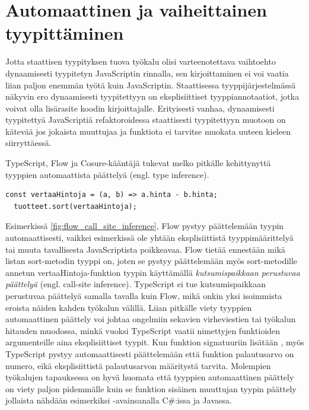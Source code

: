 \section{Automaattinen ja vaiheittainen tyypittäminen}

Jotta staattisen tyypityksen tuova työkalu olisi varteenotettava vaihtoehto
dynaamisesti tyypitetyn JavaScriptin rinnalla, sen kirjoittaminen ei voi vaatia
liian paljon enemmän työtä kuin JavaScriptin. Staattisessa tyyppijärjestelmässä
näkyvin ero dynaamisesti tyypitettyyn on eksplisiittiset tyyppiannotaatiot,
jotka voivat olla lisärasite koodin kirjoittajalle. Erityisesti vanhaa,
dynaamisesti tyypitettyä JavaScriptiä refaktoroidessa staattisesti tyypitettyyn
muotoon on kätevää jos jokaista muuttujaa ja funktiota ei tarvitse muokata
uuteen kieleen siirryttäessä.

TypeScript, Flow ja Cosure-kääntäjä tukevat melko pitkälle kehittynyttä
tyyppien automaattista päättelyä (engl. type inference).
\begin{lstlisting}[caption={
  Flow pystyy tulkitsemaan vertaaHintoja-funktion tyypin automaattisesti, ilman eksplisiittisiä tyyppimäärittelyitä.
  },
  label={fig:flow_call_site_inference},
  aboveskip={20pt}
]
  const vertaaHintoja = (a, b) => a.hinta - b.hinta;
  tuotteet.sort(vertaaHintoja);
\end{lstlisting}
Esimerkissä \ref{fig:flow_call_site_inference}, Flow pystyy päättelemään
tyypin \newline
{} automaattisesti,\newline
vaikkei esimerkissä ole yhtään eksplisiittistä tyyppimäärittelyä tai
muuta tavallisesta\newline
JavaScriptista poikkeavaa. Flow tietää ennestään
mikä listan sort-metodin tyyppi on, joten se pystyy päättelemään myös
sort-metodille annetun vertaaHintoja-funktion tyypin käyttämällä
\textit{kutsumispaikkaan perustuvaa päättelyä} (engl. call-site inference).
TypeScript ei tue kutsumispaikkaan perustuvaa päättelyä samalla tavalla kuin
Flow, mikä onkin yksi isoimmista eroista näiden kahden työkalun välillä.
Liian pitkälle viety tyyppien automaattinen päättely voi johtaa ongelmiin
sekavien virheviestien tai työkalun hitauden muodossa, minkä vuoksi TypeScript
vaatii nimettyjen funktioiden argumenteille aina eksplisiittiset tyypit.
Kun funktion signatuuriin lisätään ,
myös TypeScript pystyy automaattisesti päättelemään että funktion palautusarvo
on numero, eikä eksplisiittistä  palautusarvon
määritystä tarvita.
Molempien työkalujen tapauksessa on hyvä huomata että tyyppien automaattinen
päättely on viety paljon pidemmälle kuin se funktion sisäinen muuttujan
tyypin päättely jollaista nähdään esimerkiksi
-avainsanalla C\#:issa ja Javassa.


